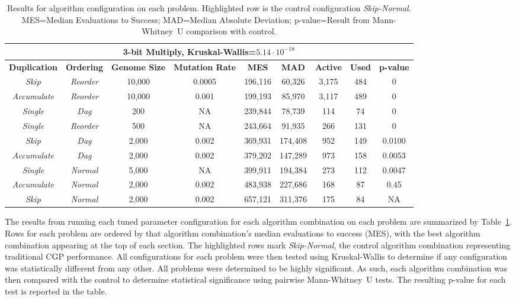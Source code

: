 \documentclass[journal]{IEEEtran}
\begin{document}
\begin{table}
\begin{tabular}{|c|c|c|c|c|c|c|c|c|}
	  \multicolumn{9}{|c|}{\textbf{3-bit Multiply}, Kruskal-Wallis=$5.14\cdot 10^{-18}$} \\ \hline

\textbf{Duplication} & \textbf{Ordering} & \textbf{Genome Size} & \textbf{Mutation Rate} & \textbf{MES} & \textbf{MAD} & \textbf{Active} & \textbf{Used} & \textbf{p-value} \\ \hline
\emph{Skip} & \emph{Reorder}      & 10,000 & 0.0005  & 196,116  & 60,326  & 3,175 & 484 & 0  \\ \hline
\emph{Accumulate} & \emph{Reorder}& 10,000 & 0.001 & 199,193 & 85,970 & 3,117 & 489 & 0  \\ \hline
\emph{Single} & \emph{Dag} & 200  & NA & 239,844 & 78,739 & 114 & 74 & 0 \\ \hline
\emph{Single} & \emph{Reorder}    & 500   & NA & 243,664 & 91,935 & 266 & 131 & 0 \\ \hline
\emph{Skip} & \emph{Dag}          & 2,000 & 0.002 & 369,931 & 174,408 & 952 & 149 & 0.0100 \\ \hline
\emph{Accumulate} & \emph{Dag}    & 2,000 & 0.002  & 379,202 & 147,289 & 973 & 158 & 0.0053  \\ \hline
\emph{Single} & \emph{Normal}     & 5,000  & NA & 399,911 & 194,384 & 273 & 112 & 0.0047 \\ \hline
\emph{Accumulate} & \emph{Normal} & 2,000 & 0.002 & 483,938 & 227,686 & 168 & 87 & 0.45 \\ \hline
\rowcolor{Gray}
\emph{Skip} & \emph{Normal} & 2,000 & 0.002 & 657,121 & 311,376 & 175 & 84 & NA \\ \hline

	\end{tabular}
	\caption{Results for algorithm configuration on each problem.  Highlighted row
	is the control configuration \emph{Skip-Normal}.  MES=Median Evaluations to Success; MAD=Median
	Absolute Deviation; p-value=Result from Mann-Whitney~U comparison with control.
	}
	\label{tab:results}
\end{table}

The results from running each tuned parameter configuration for each algorithm
combination on each problem are summarized by Table~\ref{tab:results}.
Rows for each problem are ordered by that algorithm combination's median evaluations to
success (MES), with the best algorithm combination appearing at the top of each section.
The highlighted rows mark \emph{Skip-Normal}, the control algorithm combination
representing traditional CGP performance.  All configurations for each problem
were then tested using Kruskal-Wallis to determine if any configuration was
statistically different from any other.  All problems were determined to be highly significant.
As such, each algorithm combination was then compared with the control
to determine statistical significance using pairwise Mann-Whitney~U tests. The
resulting p-value for each test is reported in the table.
\end{document}
